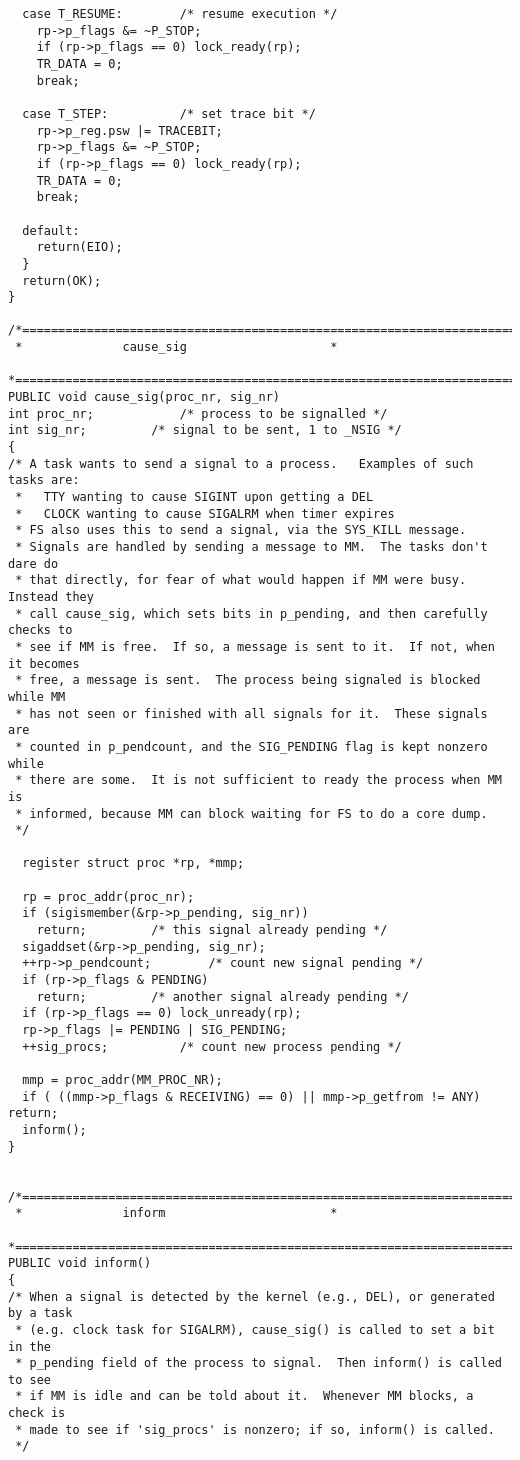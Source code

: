 \begin{verbatim}
  case T_RESUME:		/* resume execution */
	rp->p_flags &= ~P_STOP;
	if (rp->p_flags == 0) lock_ready(rp);
	TR_DATA = 0;
	break;

  case T_STEP:			/* set trace bit */
	rp->p_reg.psw |= TRACEBIT;
	rp->p_flags &= ~P_STOP;
	if (rp->p_flags == 0) lock_ready(rp);
	TR_DATA = 0;
	break;

  default:
	return(EIO);
  }
  return(OK);
}

/*===========================================================================*
 *				cause_sig				     *
 *===========================================================================*/
PUBLIC void cause_sig(proc_nr, sig_nr)
int proc_nr;			/* process to be signalled */
int sig_nr;			/* signal to be sent, 1 to _NSIG */
{
/* A task wants to send a signal to a process.   Examples of such tasks are:
 *   TTY wanting to cause SIGINT upon getting a DEL
 *   CLOCK wanting to cause SIGALRM when timer expires
 * FS also uses this to send a signal, via the SYS_KILL message.
 * Signals are handled by sending a message to MM.  The tasks don't dare do
 * that directly, for fear of what would happen if MM were busy.  Instead they
 * call cause_sig, which sets bits in p_pending, and then carefully checks to
 * see if MM is free.  If so, a message is sent to it.  If not, when it becomes
 * free, a message is sent.  The process being signaled is blocked while MM
 * has not seen or finished with all signals for it.  These signals are
 * counted in p_pendcount, and the SIG_PENDING flag is kept nonzero while
 * there are some.  It is not sufficient to ready the process when MM is
 * informed, because MM can block waiting for FS to do a core dump.
 */

  register struct proc *rp, *mmp;

  rp = proc_addr(proc_nr);
  if (sigismember(&rp->p_pending, sig_nr))
	return;			/* this signal already pending */
  sigaddset(&rp->p_pending, sig_nr);
  ++rp->p_pendcount;		/* count new signal pending */
  if (rp->p_flags & PENDING)
	return;			/* another signal already pending */
  if (rp->p_flags == 0) lock_unready(rp);
  rp->p_flags |= PENDING | SIG_PENDING;
  ++sig_procs;			/* count new process pending */

  mmp = proc_addr(MM_PROC_NR);
  if ( ((mmp->p_flags & RECEIVING) == 0) || mmp->p_getfrom != ANY) return;
  inform();
}


/*===========================================================================*
 *				inform					     *
 *===========================================================================*/
PUBLIC void inform()
{
/* When a signal is detected by the kernel (e.g., DEL), or generated by a task
 * (e.g. clock task for SIGALRM), cause_sig() is called to set a bit in the
 * p_pending field of the process to signal.  Then inform() is called to see
 * if MM is idle and can be told about it.  Whenever MM blocks, a check is
 * made to see if 'sig_procs' is nonzero; if so, inform() is called.
 */


\end{verbatim}
